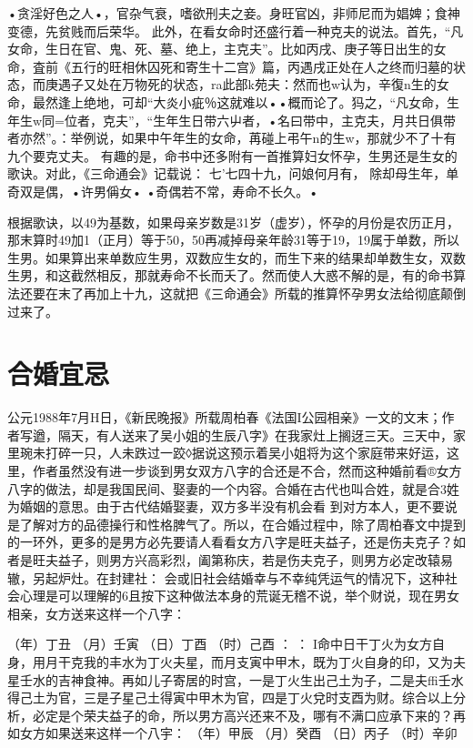 •贪淫好色之人•，官杂气衰，嗜欲刑夫之妾。身旺官凶，非师尼而为娼婢；食神变德，先贫贱而后荣华。
此外，在看女命时还盛行着一种克夫的说法。首先，“凡女命，生日在官、鬼、死、墓、绝上，主克夫”。比如丙戌、庚子等日出生的女命，査前《五行的旺相休囚死和寄生十二宫》篇，丙遇戌正处在人之终而归墓的状态，而庚遇子又处在万物死的状态，ra此部k苑夫：然而也w认为，辛復n生的女命，最然逢上绝地，可却“大炎小疵％这就难以••概而论了。犸之，“凡女命，生年生w同=位者，克夫”，“生年生日带六屮者，•名曰带中，主克夫，月共日俱带者亦然”。：举例说，如果中午年生的女命，苒碰上弔午n的生w，那就少不了十有九个要克丈夫。
有趣的是，命书中还多附有一首推算妇女怀孕，生男还是生女的歌诀。对此，《三命通会》记载说：
七'七四十九，问娘何月有，
除却母生年，单奇双是偶，•许男偁女•
•奇偶若不常，寿命不长久。•

根据歌诀，以49为基数，如果母亲岁数是31岁（虚岁），怀孕的月份是农历正月，那末算时49加1（正月）等于50，50再减掉母亲年龄31等于19，19属于单数，所以生男。如果算出来单数应生男，双数应生女的，而生下来的结果却单数生女，双数生男，和这截然相反，那就寿命不长而夭了。然而使人大惑不解的是，有的命书算法还要在末了再加上十九，这就把《三命通会》所载的推算怀孕男女法给彻底颠倒过来了。	

\section{合婚宜忌}
公元1988年7月H日，《新民晚报》所载周柏春《法国I公园相亲》一文的文末；作者写遒，隔天，有人送来了吴小姐的生辰八字》在我家灶上搁迓三天。三天中，家里琬未打碎一只，人未跌过一跤◊据说这预示着吴小姐将为这个家庭带来好运，这里，作者虽然没有进一步谈到男女双方八字的合还是不合，然而这种婚前看®女方八字的做法，却是我国民间、娶妻的一个内容。合婚在古代也叫合姓，就是合3姓为婚姻的意思。由于古代结婚娶妻，双方多半没有机会看	到对方本人，更不要说是了解对方的品德操行和性格脾气了。所以，在合婚过程中，除了周柏春文中提到的一环外，更多的是男方必先要请人看看女方八字是旺夫益子，还是伤夫克子？如者是旺夫益子，则男方兴高彩烈，阖第称庆，若是伤夫克子，则男方必定改辕易辙，另起炉灶。在封建社：	会或旧社会结婚幸与不幸纯凭运气的情况下，这种社会心理是可以理解的6且按下这种做法本身的荒诞无稽不说，举个财说，现在男女相亲，女方送来这样一个八字：

（年）丁丑
（月）壬寅
（日）丁酉
（时）己酉	：	：	
I命中日干丁火为女方自身，用月干克我的丰水为丁火夫星，而月支寅中甲木，既为丁火自身的印，又为夫星壬水的吉神食神。再如儿子寄居的时宫，一是丁火生出己土为子，二是夫ffi壬水得己土为官，三是子星己土得寅中甲木为官，四是丁火兌时支酉为财。综合以上分析，必定是个荣夫益子的命，所以男方高兴还来不及，哪有不满口应承下来的？再如女方如果送来这样一个八宇：
（年）甲辰
（月）癸酉
（日）丙子
（时）辛卯

